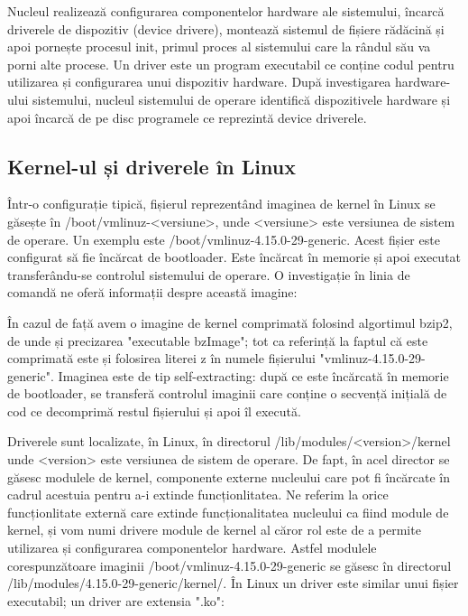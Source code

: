 Nucleul realizează configurarea componentelor hardware ale sistemului, încarcă
driverele de dispozitiv (device drivere), montează sistemul de fișiere rădăcină
și apoi pornește procesul init, primul proces al sistemului care la rândul său
va porni alte procese. Un driver este un program executabil ce conține codul
pentru utilizarea și configurarea unui dispozitiv hardware. După investigarea
hardware-ului sistemului, nucleul sistemului de operare identifică dispozitivele
hardware și apoi încarcă de pe disc programele ce reprezintă device driverele.

\subsection{Kernel-ul și driverele în Linux}
\label{sec:boot-bootupos-linux}

Într-o configurație tipică, fișierul reprezentând imaginea de kernel în Linux se
găsește în /boot/vmlinuz-<versiune>, unde <versiune> este versiunea de sistem de
operare. Un exemplu este /boot/vmlinuz-4.15.0-29-generic. Acest fișier este
configurat să fie încărcat de bootloader. Este încărcat în memorie și apoi
executat transferându-se controlul sistemului de operare. O investigație în
linia de comandă ne oferă informații despre această imagine:


În cazul de față avem o imagine de kernel comprimată folosind algortimul bzip2,
de unde și precizarea "executable bzImage"; tot ca referință la faptul că este
comprimată este și folosirea literei z în numele fișierului
"vmlinuz-4.15.0-29-generic". Imaginea este de tip self-extracting: după ce este
încărcată în memorie de bootloader, se transferă controlul imaginii care conține
o secvență inițială de cod ce decomprimă restul fișierului și apoi îl execută.

Driverele sunt localizate, în Linux, în directorul /lib/modules/<version>/kernel
unde <version> este versiunea de sistem de operare. De fapt, în acel director se
găsesc modulele de kernel, componente externe nucleului care pot fi încărcate în
cadrul acestuia pentru a-i extinde funcționlitatea. Ne referim la orice
funcționlitate externă care extinde funcționalitatea nucleului ca fiind module
de kernel, și vom numi drivere module de kernel al căror rol este de a permite
utilizarea și configurarea componentelor hardware. Astfel modulele
corespunzătoare imaginii /boot/vmlinuz-4.15.0-29-generic se găsesc în directorul
/lib/modules/4.15.0-29-generic/kernel/. În Linux un driver este similar unui
fișier executabil; un driver are extensia ".ko":

